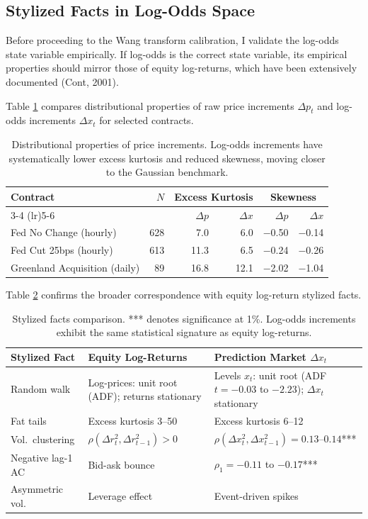 \documentclass[12pt,a4paper]{article}
\begin{document}
\subsection{Stylized Facts in Log-Odds
Space}\label{stylized-facts-in-log-odds-space}

Before proceeding to the Wang transform calibration, I validate the
log-odds state variable empirically. If log-odds is the correct state
variable, its empirical properties should mirror those of equity
log-returns, which have been extensively documented (Cont, 2001).

Table \ref{tab:distributional} compares distributional properties of raw
price increments \(\Delta p_t\) and log-odds increments \(\Delta x_t\)
for selected contracts.

\begin{table}[H]
\centering
\begin{tabular}{lrrrrr}
\toprule
Contract & $N$ & \multicolumn{2}{c}{Excess Kurtosis} & \multicolumn{2}{c}{Skewness} \\
\cmidrule(lr){3-4} \cmidrule(lr){5-6}
 & & $\Delta p$ & $\Delta x$ & $\Delta p$ & $\Delta x$ \\
\midrule
Fed No Change (hourly) & 628 & 7.0 & 6.0 & $-$0.50 & $-$0.14 \\
Fed Cut 25bps (hourly) & 613 & 11.3 & 6.5 & $-$0.24 & $-$0.26 \\
Greenland Acquisition (daily) & 89 & 16.8 & 12.1 & $-$2.02 & $-$1.04 \\
\bottomrule
\end{tabular}
\caption{Distributional properties of price increments. Log-odds increments have systematically lower excess kurtosis and reduced skewness, moving closer to the Gaussian benchmark.}
\label{tab:distributional}
\end{table}

Table \ref{tab:stylized_facts} confirms the broader correspondence with
equity log-return stylized facts.

\begin{table}[H]
\centering
\begin{tabular}{lp{4.8cm}p{5.2cm}}
\toprule
Stylized Fact & Equity Log-Returns & Prediction Market $\Delta x_t$ \\
\midrule
Random walk & Log-prices: unit root (ADF); returns stationary & Levels $x_t$: unit root (ADF $t = -0.03$ to $-2.23$); $\Delta x_t$ stationary \\[3pt]
Fat tails & Excess kurtosis 3--50 & Excess kurtosis 6--12 \\[3pt]
Vol.\ clustering & $\rho(\Delta r^2_t, \Delta r^2_{t-1}) > 0$ & $\rho(\Delta x^2_t, \Delta x^2_{t-1}) = 0.13$--$0.14$*** \\[3pt]
Negative lag-1 AC & Bid-ask bounce & $\rho_1 = -0.11$ to $-0.17$*** \\[3pt]
Asymmetric vol. & Leverage effect & Event-driven spikes \\
\bottomrule
\end{tabular}
\caption{Stylized facts comparison. *** denotes significance at 1\%. Log-odds increments exhibit the same statistical signature as equity log-returns.}
\label{tab:stylized_facts}
\end{table}
\end{document}
